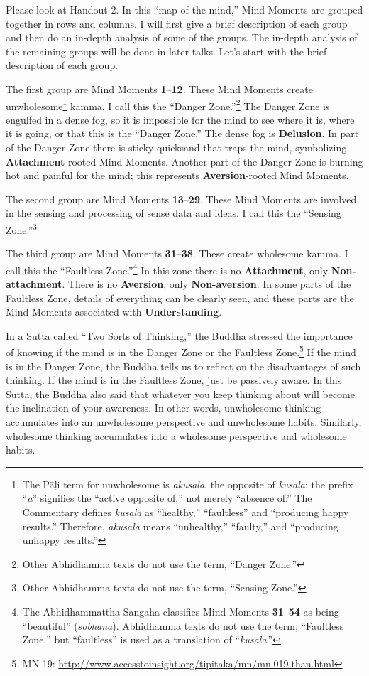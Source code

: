 Please look at Handout 2. In this “map of the mind,” Mind Moments are grouped together in rows and columns. I will first give a brief description of each group and then do an in-depth analysis of some of the groups. The in-depth analysis of the remaining groups will be done in later talks. Let’s start with the brief description of each group.

The first group are Mind Moments \textbf{1}--\textbf{12}. These Mind Moments create unwholesome\footnote{The Pāḷi term for unwholesome is \textit{akusala}, the opposite of \textit{kusala}; the prefix “\textit{a}” signifies the “active opposite of,” not merely “absence of.” The Commentary defines \textit{kusala} as “healthy,” “faultless” and “producing happy results.” Therefore, \textit{akusala} means “unhealthy,” “faulty,” and “producing unhappy results.”} kamma. I call this the “Danger Zone.”\footnote{Other Abhidhamma texts do not use the term, “Danger Zone.”} The Danger Zone is engulfed in a dense fog, so it is impossible for the mind to see where it is, where it is going, or that this is the “Danger Zone.” The dense fog is \textbf{Delusion}. In part of the Danger Zone there is sticky quicksand that traps the mind, symbolizing \textbf{Attachment}-rooted Mind Moments. Another part of the Danger Zone is burning hot and painful for the mind; this represents \textbf{Aversion}-rooted Mind Moments.

The second group are Mind Moments \textbf{13}--\textbf{29}. These Mind Moments are involved in the sensing and processing of sense data and ideas. I call this the “Sensing Zone.”\footnote{Other Abhidhamma texts do not use the term, “Sensing Zone.”}

The third group are Mind Moments \textbf{31}--\textbf{38}. These create wholesome kamma. I call this the “Faultless Zone.”\footnote{The Abhidhammattha Sangaha classifies Mind Moments \textbf{31}--\textbf{54} as being “beautiful” (\textit{sobhana}). Abhidhamma texts do not use the term, “Faultless Zone,” but “faultless” is used as a translation of “\textit{kusala}.”} In this zone there is no \textbf{Attachment}, only \textbf{Non-attachment}. There is no \textbf{Aversion}, only \textbf{Non-aversion}. In some parts of the Faultless Zone, details of everything can be clearly seen, and these parts are the Mind Moments associated with \textbf{Understanding}.

In a Sutta called “Two Sorts of Thinking,” the Buddha stressed the importance of knowing if the mind is in the Danger Zone or the Faultless Zone.\footnote{MN 19: \url{http://www.accesstoinsight.org/tipitaka/mn/mn.019.than.html}} If the mind is in the Danger Zone, the Buddha tells us to reflect on the disadvantages of such thinking. If the mind is in the Faultless Zone, just be passively aware. In this Sutta, the Buddha also said that whatever you keep thinking about will become the inclination of your awareness. In other words, unwholesome thinking accumulates into an unwholesome perspective and unwholesome habits. Similarly, wholesome thinking accumulates into a wholesome perspective and wholesome habits.

